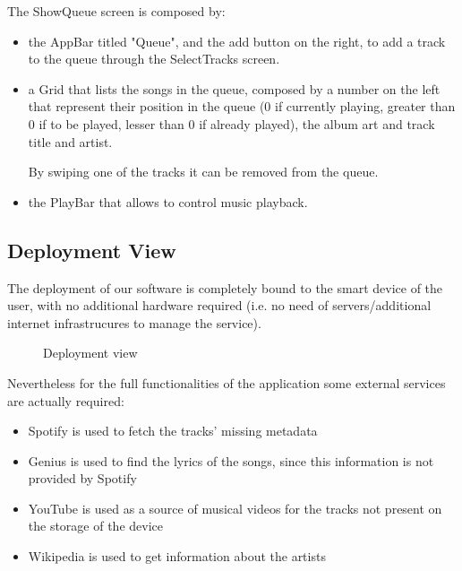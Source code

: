 \documentclass{article}
\begin{document}
The ShowQueue screen is composed by:
\begin{itemize}
    \item the AppBar titled "Queue", and the
        add button on the right, to add a track to the queue through the
        SelectTracks screen.
    \item a Grid that lists the songs in the queue, composed by a number on the
        left that represent their position in the queue (0 if currently playing,
        greater than 0 if to be played, lesser than 0 if already played), the
        album art and track title and artist.

        By swiping one of the tracks it can be removed from the queue.
    \item the PlayBar that allows to control music playback.
\end{itemize}

\subsection{Deployment View}

The deployment of our software is completely bound to the smart device of the
user, with no additional hardware required (i.e. no need of servers/additional
internet infrastrucures to manage the service). 

\begin{figure}[H]
	\noindent
	\caption{Deployment view}
\end{figure}

Nevertheless for the full functionalities of the application some external
services are actually required: 

\begin{itemize}
    \item Spotify is used to fetch the tracks' missing metadata
    \item Genius is used to find the lyrics of the songs, since this information
    is not provided by Spotify
    \item YouTube is used as a source of musical videos for the tracks not
    present on the storage of the device
    \item Wikipedia is used to get information about the artists
\end{itemize}
\end{document}
